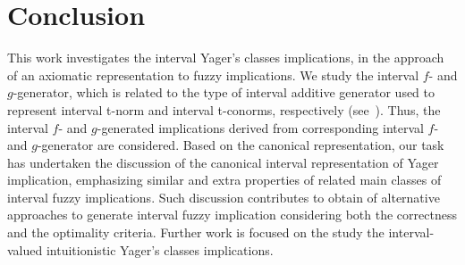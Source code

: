 \documentclass[12pt]{article}
\theoremstyle{plain}
\theoremstyle{remark}
\theoremstyle{definition}
\theoremstyle{proposition}
\begin{document}
\section{Conclusion}\label{sec-conc}

This work investigates the interval Yager's classes implications, in the approach of an axiomatic representation to fuzzy implications.  We study the interval $f$- and $g$-generator, which is related to the type of interval additive generator used to represent interval t-norm and interval t-conorms, respectively (see~\cite{BDSR11}). Thus, the interval $f$- and $g$-generated implications derived from corresponding interval $f$- and $g$-generator are considered. Based on the canonical representation, our task has undertaken the discussion of the canonical interval representation of  Yager implication, emphasizing similar and extra properties of related main classes of interval fuzzy implications. Such discussion contributes to obtain of alternative approaches to generate interval fuzzy implication considering both the correctness and the optimality criteria. Further work is focused on the study the interval-valued intuitionistic Yager's classes implications.\vspace{-0.5cm}
\end{document}
